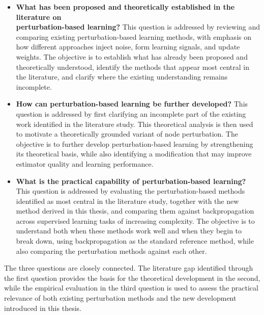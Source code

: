\begin{itemize}

    \item \textbf{What has been proposed and theoretically established in the literature on\\ perturbation-based learning?}  
    This question is addressed by reviewing and comparing existing perturbation-based learning methods, with emphasis on how different approaches inject noise, form learning signals, and update weights. The objective is to establish what has already been proposed and theoretically understood, identify the methods that appear most central in the literature, and clarify where the existing understanding remains incomplete.

    \item \textbf{How can perturbation-based learning be further developed?}  
    This question is addressed by first clarifying an incomplete part of the existing work identified in the literature study. This theoretical analysis is then used to motivate a theoretically grounded variant of node perturbation. The objective is to further develop perturbation-based learning by strengthening its theoretical basis, while also identifying a modification that may improve estimator quality and learning performance.

    \item \textbf{What is the practical capability of perturbation-based learning?}  
    This question is addressed by evaluating the perturbation-based methods identified as most central in the literature study, together with the new method derived in this thesis, and comparing them against backpropagation across supervised learning tasks of increasing complexity. The objective is to understand both when these methods work well and when they begin to break down, using backpropagation as the standard reference method, while also comparing the perturbation methods against each other.

\end{itemize}

The three questions are closely connected. The literature gap identified through the first question provides the basis for the theoretical development in the second, while the empirical evaluation in the third question is used to assess the practical relevance of both existing perturbation methods and the new development introduced in this thesis.

